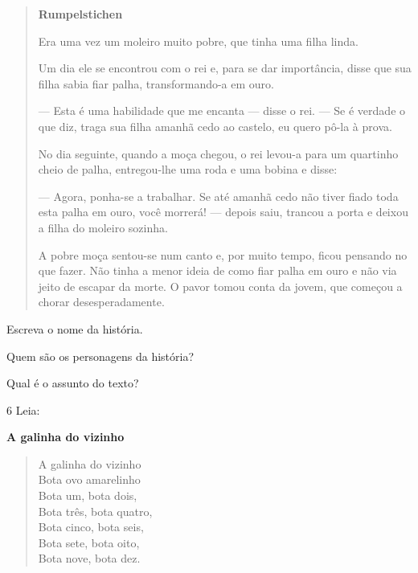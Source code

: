 \begin{quote}
\textbf{Rumpelstichen}

Era uma vez um moleiro muito pobre, que tinha uma filha linda.

Um dia ele se encontrou com o rei e, para se dar importância,
disse que sua filha sabia fiar palha, transformando-a em ouro.

--- Esta é uma habilidade que me encanta --- disse o
rei. --- Se é verdade o que diz, traga sua filha amanhã cedo ao
castelo, eu quero pô-la à prova.

No dia seguinte, quando a moça chegou, o rei levou-a
para um quartinho cheio de palha, entregou-lhe uma roda e uma
bobina e disse:

--- Agora, ponha-se a trabalhar. Se até amanhã cedo
não tiver fiado toda esta palha em ouro, você morrerá! ---
depois saiu, trancou a porta e deixou a filha do moleiro
sozinha.

A pobre moça sentou-se num canto e, por muito tempo,
ficou pensando no que fazer. Não tinha a menor ideia de como
fiar palha em ouro e não via jeito de escapar da morte. O
pavor tomou conta da jovem, que começou a chorar
desesperadamente.
\end{quote}


\begin{escolha}
\item Escreva o nome da história.


\item Quem são os personagens da história?


\item Qual é o assunto do texto?

\end{escolha}

\num{6} Leia:

\textbf{A galinha do vizinho}

\begin{verse}
A galinha do vizinho\\
Bota ovo amarelinho\\
Bota um, bota dois,\\
Bota três, bota quatro,\\
Bota cinco, bota seis,\\
Bota sete, bota oito,\\
Bota nove, bota dez.
\end{verse}

